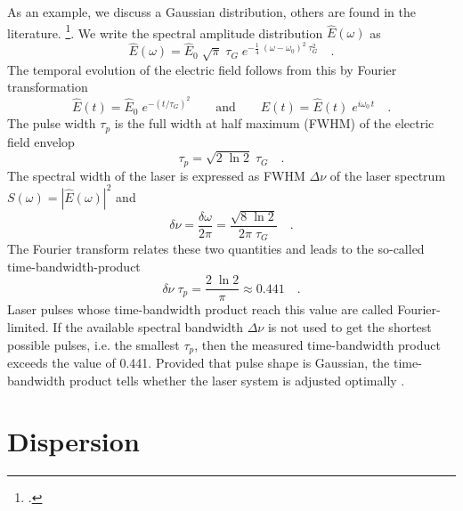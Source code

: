 As an example, we discuss a Gaussian distribution, others are found in the literature. \footcite{DielsRudolph1996,Rulliere2005}.
We write the spectral amplitude distribution $\hat{E}(\omega)$ as
\begin{equation}
  \hat{E}(\omega) = \hat{E}_0 \; \sqrt{\pi} \; \tau_G \; e^{-
  \frac{1}{4} \; (\omega - \omega_0)^2 \; \tau_G^2} \quad .
\end{equation}
The temporal evolution of the electric field follows from this by
Fourier transformation
\begin{equation}
  \hat {E}(t) = \hat{E}_0 \; e^{- ( t / \tau_G ) ^2}
  \qquad\text{and}\qquad E(t) = \hat{E}(t)\; e^{i \omega_0 \, t} \quad .
\end{equation}
The pulse width $\tau_p$ is the full width at half maximum (FWHM) of the electric field envelop
\begin{equation}
  \tau_p = \sqrt{2 \; \ln 2} \; \tau_G \quad.
\end{equation}
The spectral width of the laser is expressed as FWHM $\Delta
\nu$ of the laser spectrum $S(\omega) =
|\hat{E}(\omega)|^2$ and
\begin{equation}
  \delta \nu = \frac{\delta \omega}{2 \pi} = \frac{\sqrt{8 \; \ln
  2}}{2 \pi \; \tau_G} \quad.
\end{equation}
The Fourier transform relates these two quantities and leads to the so-called time-bandwidth-product
\begin{equation}
  \delta \nu \; \tau_p = \frac{2 \; \ln 2}{\pi} \approx 0.441 \quad .
\end{equation}
Laser pulses whose time-bandwidth product reach this value
are called Fourier-limited. If the available
 spectral bandwidth $\Delta \nu$ is not used
to get the shortest possible pulses, i.e. the smallest $\tau_p$,
then the measured time-bandwidth product exceeds the
value of 0.441. Provided that pulse shape is Gaussian, the time-bandwidth product tells whether the 
laser system is adjusted optimally .

\section{Dispersion}

